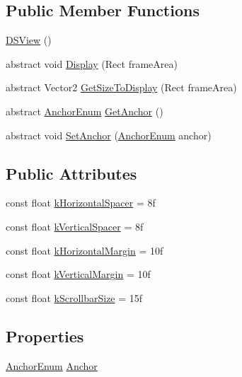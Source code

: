 \subsection*{Public Member Functions}
\begin{DoxyCompactItemize}
\item 
\hyperlink{class_d_s_view_a5befc93423864599224cba60d47bc304}{D\+S\+View} ()
\item 
abstract void \hyperlink{class_d_s_view_ad63755f64c4c2f6efc936956de0f12fc}{Display} (Rect frame\+Area)
\item 
abstract Vector2 \hyperlink{class_d_s_view_a97c04733e33ccb7a0b115cef76e3e840}{Get\+Size\+To\+Display} (Rect frame\+Area)
\item 
abstract \hyperlink{class_d_s_view_a8b41b9ec1b18bd33872a37cbd3a2dbe1}{Anchor\+Enum} \hyperlink{class_d_s_view_a8c31c0683dc8fb64c0e9228f094f19ec}{Get\+Anchor} ()
\item 
abstract void \hyperlink{class_d_s_view_a29230a74867dbbd01d5f79506f354fd9}{Set\+Anchor} (\hyperlink{class_d_s_view_a8b41b9ec1b18bd33872a37cbd3a2dbe1}{Anchor\+Enum} anchor)
\end{DoxyCompactItemize}
\subsection*{Public Attributes}
\begin{DoxyCompactItemize}
\item 
const float \hyperlink{class_d_s_view_a54308b2e24c6fd769eb1045a72209189}{k\+Horizontal\+Spacer} = 8f
\item 
const float \hyperlink{class_d_s_view_a74b4b6fe47ce6aa38b5992a8273b90b0}{k\+Vertical\+Spacer} = 8f
\item 
const float \hyperlink{class_d_s_view_aac2d9d71c9785d04692ff9338b326506}{k\+Horizontal\+Margin} = 10f
\item 
const float \hyperlink{class_d_s_view_a0a48eeb269e3eececb312fe0d8bd0ab9}{k\+Vertical\+Margin} = 10f
\item 
const float \hyperlink{class_d_s_view_a79cbc537a62e1307c27305bfebf5547c}{k\+Scrollbar\+Size} = 15f
\end{DoxyCompactItemize}
\subsection*{Properties}
\begin{DoxyCompactItemize}
\item 
\hyperlink{class_d_s_view_a8b41b9ec1b18bd33872a37cbd3a2dbe1}{Anchor\+Enum} \hyperlink{class_d_s_view_a1ab604c5f8e02a913de8a27471a674ed}{Anchor}
\end{DoxyCompactItemize}


